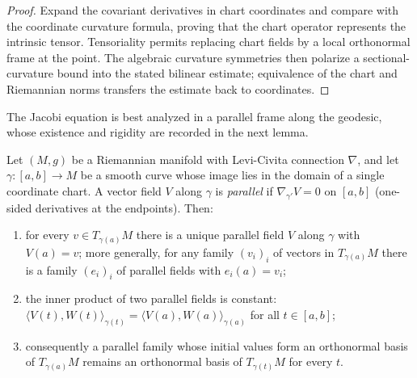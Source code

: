 \begin{proof}
\sketch
\leanok
{}
Expand the covariant derivatives in chart coordinates and compare with the coordinate curvature formula, proving that the chart operator represents the intrinsic tensor. Tensoriality permits replacing chart fields by a local orthonormal frame at the point. The algebraic curvature symmetries then polarize a sectional-curvature bound into the stated bilinear estimate; equivalence of the chart and Riemannian norms transfers the estimate back to coordinates.
\end{proof}

The Jacobi equation is best analyzed in a parallel frame along the
geodesic, whose existence and rigidity are recorded in the next
lemma.

\begin{lemma}
\label{lem:parallel-frame}
\leanok



Let $(M,g)$ be a Riemannian manifold with Levi-Civita connection
$\nabla$, and let $\gamma\colon[a,b]\to M$ be a smooth curve whose
image lies in the domain of a single coordinate chart. A vector field
$V$ along $\gamma$ is {\em parallel} if $\nabla_{\gamma'}V=0$ on
$[a,b]$ (one-sided derivatives at the endpoints). Then:
\begin{enumerate}
\item for every $v\in T_{\gamma(a)}M$ there is a unique parallel
field $V$ along $\gamma$ with $V(a)=v$; more generally, for any
family $(v_i)_i$ of vectors in $T_{\gamma(a)}M$ there is a family
$(e_i)_i$ of parallel fields with $e_i(a)=v_i$;
\item the inner product of two parallel fields is constant:
$\langle V(t),W(t)\rangle_{\gamma(t)}
=\langle V(a),W(a)\rangle_{\gamma(a)}$ for all $t\in[a,b]$;
\item consequently a parallel family whose initial values form an
orthonormal basis of $T_{\gamma(a)}M$ remains an orthonormal basis
of $T_{\gamma(t)}M$ for every $t$.
\end{enumerate}
\end{lemma}


